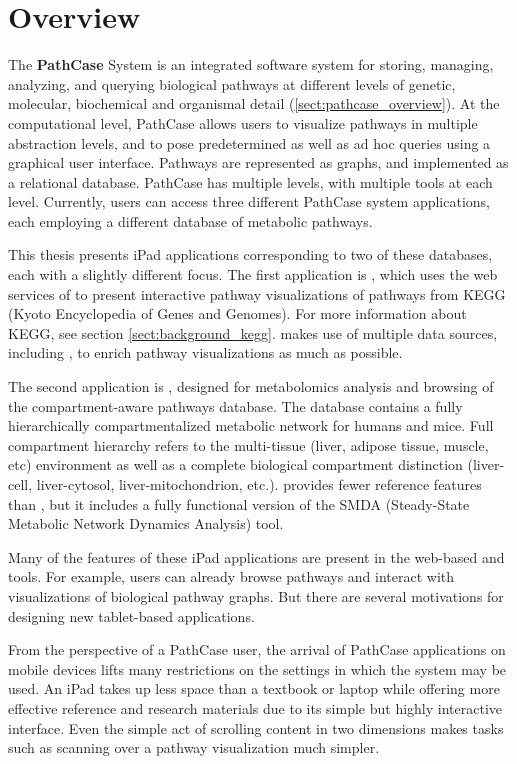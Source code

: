 \section{Overview}
\label{sect:overview}

The \textbf{PathCase} System \cite{pathcase-basic} is an integrated software
system for storing, managing, analyzing, and querying biological pathways at
different levels of genetic, molecular, biochemical and organismal detail
(\ref{sect:pathcase_overview}). At the computational level, PathCase allows
users to visualize pathways in multiple abstraction levels, and to pose
predetermined as well as ad hoc queries using a graphical user interface.
Pathways are represented as graphs, and implemented as a relational database.
PathCase has multiple levels, with multiple tools at each level. Currently,
users can access three different PathCase system applications, each employing a
different database of metabolic pathways.

This thesis presents iPad applications corresponding to two of these databases,
each with a slightly different focus. The first application is \keggapp, which
uses the web services of \pathcasekegg to present interactive pathway
visualizations of pathways from KEGG (Kyoto Encyclopedia of Genes and Genomes).
For more information about KEGG, see section \ref{sect:background_kegg}.
\keggapp makes use of multiple data sources, including \pathcasekegg, to enrich
pathway visualizations as much as possible.

The second application is \mawapp, designed for metabolomics analysis and
browsing of the compartment-aware \pathcasemaw pathways database. The
\pathcasemaw database contains a fully hierarchically compartmentalized
metabolic network for humans and mice. Full compartment hierarchy refers to the
multi-tissue (liver, adipose tissue, muscle, etc) environment as well as a
complete biological compartment distinction (liver-cell, liver-cytosol,
liver-mitochondrion, etc.). \mawapp provides fewer reference features than
\keggapp, but it includes a fully functional version of the SMDA (Steady-State
Metabolic Network Dynamics Analysis) tool.

Many of the features of these iPad applications are present in the web-based
\pathcasemaw and \pathcasekegg tools. For example, users can already browse
pathways and interact with visualizations of biological pathway graphs. But
there are several motivations for designing new tablet-based applications.

From the perspective of a PathCase user, the arrival of PathCase applications on
mobile devices lifts many restrictions on the settings in which the system may
be used. An iPad takes up less space than a textbook or laptop while offering
more effective reference and research materials due to its simple but
highly interactive interface. Even the simple act of scrolling content in two
dimensions makes tasks such as scanning over a pathway visualization much
simpler.

